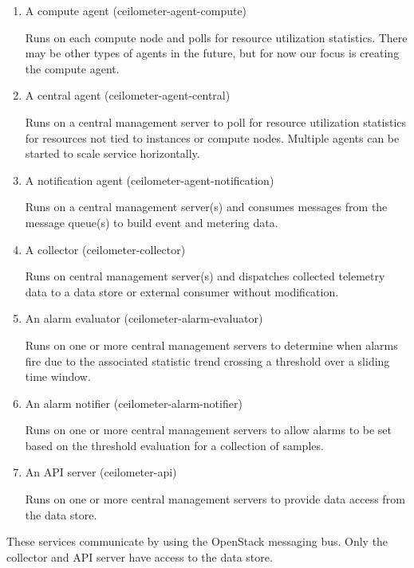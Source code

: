     \begin{enumerate}
        \item A compute agent (ceilometer-agent-compute)
        \par Runs on each compute node and polls for resource utilization statistics. There may be other types of agents in the future, but for now our focus is creating the compute agent.
        
        \item A central agent (ceilometer-agent-central)
        \par Runs on a central management server to poll for resource utilization statistics for resources not tied to instances or compute nodes. Multiple agents can be started to scale service horizontally.
        
        \item A notification agent (ceilometer-agent-notification)
        \par Runs on a central management server(s) and consumes messages from the message queue(s) to build event and metering data.
        
        \item A collector (ceilometer-collector)
        \par Runs on central management server(s) and dispatches collected telemetry data to a data store or external consumer without modification.
        
        \item An alarm evaluator (ceilometer-alarm-evaluator)
        \par Runs on one or more central management servers to determine when alarms fire due to the associated statistic trend crossing a threshold over a sliding time window.
        
        \item An alarm notifier (ceilometer-alarm-notifier)
        \par Runs on one or more central management servers to allow alarms to be set based on the threshold evaluation for a collection of samples.
        
        \item An API server (ceilometer-api)
        \par Runs on one or more central management servers to provide data access from the data store.
    \end{enumerate}
    \par These services communicate by using the OpenStack messaging bus. Only the collector and API server have access to the data store.
    
